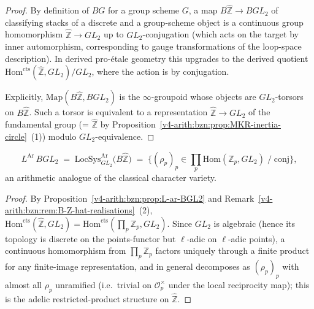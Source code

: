 \begin{proof}
By definition of \(BG\) for a group scheme \(G\), a map
\(B\widehat{\mathbb{Z}}\to BGL_{2}\) of classifying stacks of a
discrete and a group-scheme object is a continuous group
homomorphism \(\widehat{\mathbb{Z}}\to GL_{2}\) up to \(GL_{2}\)-conjugation
(which acts on the target by inner automorphism, corresponding to
gauge transformations of the loop-space description). In derived
pro-\'etale geometry this upgrades to the derived quotient
\(\mathrm{Hom}^{\mathrm{cts}}(\widehat{\mathbb{Z}},GL_{2})/GL_{2}\),
where the action is by conjugation.

Explicitly, \(\mathrm{Map}(B\widehat{\mathbb{Z}},BGL_{2})\) is the
\(\infty\)-groupoid whose objects are \(GL_{2}\)-torsors on
\(B\widehat{\mathbb{Z}}\). Such a torsor is equivalent to a
representation \(\widehat{\mathbb{Z}}\to GL_{2}\) of the fundamental
group (= \(\widehat{\mathbb{Z}}\) by
Proposition~\ref{v4-arith:bzn:prop:MKR-inertia-circle}~(1)) modulo \(GL_{2}\)-equivalence.
\end{proof}

\begin{corollary}
\label{v4-arith:bzn:cor:L-ar-BGL2-is-LocSys}

\begin{equation}
L^{\mathrm{Ar}}\,BGL_{2}\;=\;\mathrm{LocSys}^{\mathrm{Ar}}_{GL_{2}}\bigl(B\widehat{\mathbb{Z}}\bigr)\;=\;\bigl\{(\rho_{p})_{p}\in\prod_{p}\mathrm{Hom}(\mathbb{Z}_{p},GL_{2})\;/\;\mathrm{conj}\bigr\},
\end{equation}
an arithmetic analogue of the classical character variety.
\end{corollary}

\begin{proof}
By Proposition~\ref{v4-arith:bzn:prop:L-ar-BGL2} and
Remark~\ref{v4-arith:bzn:rem:B-Z-hat-realisations}~(2),
\(\mathrm{Hom}^{\mathrm{cts}}(\widehat{\mathbb{Z}},GL_{2})=\mathrm{Hom}^{\mathrm{cts}}(\prod_{p}\mathbb{Z}_{p},GL_{2})\).
Since \(GL_{2}\) is algebraic (hence its topology is discrete on the
points-functor but \(\ell\)-adic on \(\ell\)-adic points), a
continuous homomorphism from \(\prod_{p}\mathbb{Z}_{p}\) factors
uniquely through a finite product for any finite-image representation,
and in general decomposes as \((\rho_{p})_{p}\) with almost all
\(\rho_{p}\) unramified (i.e.\ trivial on \(\mathcal{O}_{p}^{\times}\)
under the local reciprocity map); this is the adelic restricted-product
structure on \(\widehat{\mathbb{Z}}\).
\end{proof}

